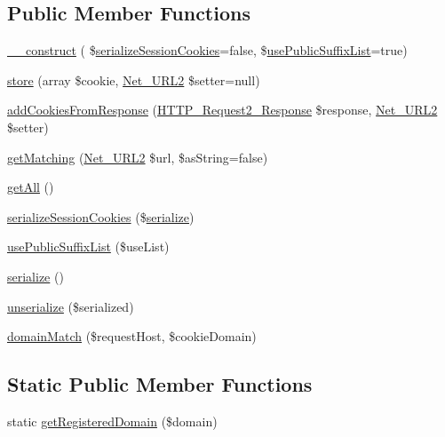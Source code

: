 \subsection*{Public Member Functions}
\begin{DoxyCompactItemize}
\item 
\hyperlink{classHTTP__Request2__CookieJar_ad653775d228539017314173cb969464f}{\+\_\+\+\_\+construct} ( \$\hyperlink{classHTTP__Request2__CookieJar_a2a81535d5a9762c3d6ae9229f2349813}{serialize\+Session\+Cookies}=false, \$\hyperlink{classHTTP__Request2__CookieJar_aa5754da6e9d23db800e091bc16fb3bc8}{use\+Public\+Suffix\+List}=true)
\item 
\hyperlink{classHTTP__Request2__CookieJar_a282b74d495d895691cf2dd4e7a7d467e}{store} (array \$cookie, \hyperlink{classNet__URL2}{Net\+\_\+\+U\+R\+L2} \$setter=null)
\item 
\hyperlink{classHTTP__Request2__CookieJar_ac36b125ea28edd3383bfc7122bfe3492}{add\+Cookies\+From\+Response} (\hyperlink{classHTTP__Request2__Response}{H\+T\+T\+P\+\_\+\+Request2\+\_\+\+Response} \$response, \hyperlink{classNet__URL2}{Net\+\_\+\+U\+R\+L2} \$setter)
\item 
\hyperlink{classHTTP__Request2__CookieJar_a1a5ded22296cb2445004e579b8f38eab}{get\+Matching} (\hyperlink{classNet__URL2}{Net\+\_\+\+U\+R\+L2} \$url, \$as\+String=false)
\item 
\hyperlink{classHTTP__Request2__CookieJar_ac38ab1d49f98cb8261b3fe8eeb482125}{get\+All} ()
\item 
\hyperlink{classHTTP__Request2__CookieJar_a2a81535d5a9762c3d6ae9229f2349813}{serialize\+Session\+Cookies} (\$\hyperlink{classHTTP__Request2__CookieJar_ac6fa68d8621d1aef56c0eb8231612839}{serialize})
\item 
\hyperlink{classHTTP__Request2__CookieJar_aa5754da6e9d23db800e091bc16fb3bc8}{use\+Public\+Suffix\+List} (\$use\+List)
\item 
\hyperlink{classHTTP__Request2__CookieJar_ac6fa68d8621d1aef56c0eb8231612839}{serialize} ()
\item 
\hyperlink{classHTTP__Request2__CookieJar_ae63b138701ec28ec7f7c7a2b90f0a3a7}{unserialize} (\$serialized)
\item 
\hyperlink{classHTTP__Request2__CookieJar_ad22bee9ce6d2c111120bf44c3e302401}{domain\+Match} (\$request\+Host, \$cookie\+Domain)
\end{DoxyCompactItemize}
\subsection*{Static Public Member Functions}
\begin{DoxyCompactItemize}
\item 
static \hyperlink{classHTTP__Request2__CookieJar_a66c53f8393c3562e58491105165e77a9}{get\+Registered\+Domain} (\$domain)
\end{DoxyCompactItemize}
